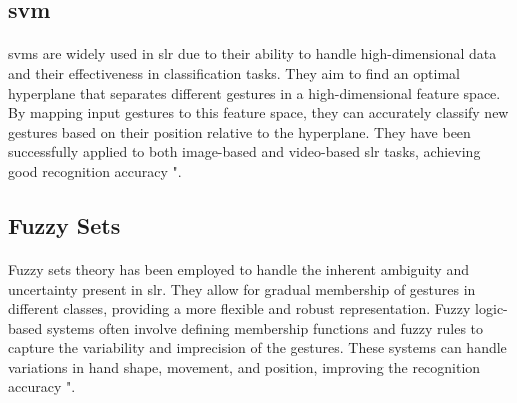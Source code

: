 \subsection{\ac{svm} }
\paragraph{}
\ac{svm}s are widely used in \ac{slr} due to their ability to handle high-dimensional data and their effectiveness in classification tasks. They aim to find an optimal hyperplane that separates different gestures in a high-dimensional feature space. By mapping input gestures to this feature space, they can accurately classify new gestures based on their position relative to the hyperplane. They have been successfully applied to both image-based and video-based \ac{slr} tasks, achieving good recognition accuracy "\cite{vapnik1996support}.

\subsection{Fuzzy Sets}
\paragraph{}
Fuzzy sets theory has been employed to handle the inherent ambiguity and uncertainty present in \ac{slr}. They allow for gradual membership of gestures in different classes, providing a more flexible and robust representation. Fuzzy logic-based systems often involve defining membership functions and fuzzy rules to capture the variability and imprecision of the gestures. These systems can handle variations in hand shape, movement, and position, improving the recognition accuracy "\cite{bezdek2013pattern}.
